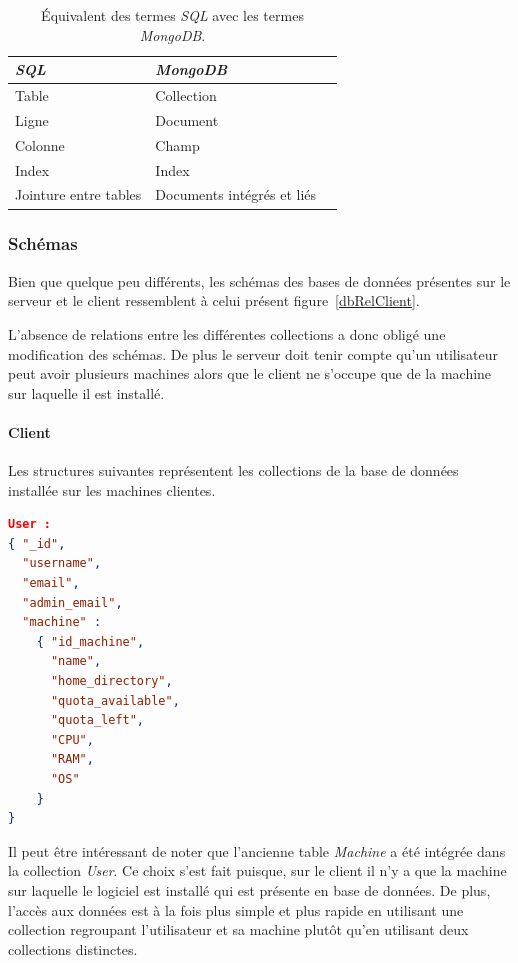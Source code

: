 \documentclass[a4paper,10pt, twoside]{report}
\begin{document}
\begin{spacing}{1.2}
\begin{table}[h!]
  \centering
  \def\arraystretch{1.5}
  \setlength{\fboxsep}{13pt} %
  \setlength{\fboxrule}{0pt} %
  \begin{tabular}{lm{6cm}m{6cm}}
   \rowcolor{arkred} 
    \arrayrulecolor{gray73}\hline
    \color{white} \textbf{\textit{SQL}} &
    \color{white} \textbf{\textit{MongoDB}}\\
    \hline
    Table & Collection\\
    \hline
    Ligne & Document\\
    \hline
    Colonne & Champ\\
    \hline
    Index & Index\\
    \hline
    Jointure entre tables & Documents intégrés et liés
  \end{tabular}
  \caption{\label{tabMappSQLMongoTerms} Équivalent des termes \textit{SQL}
  avec les termes \textit{MongoDB}.}
\end{table}

\subsubsection{Schémas}

Bien que quelque peu différents, les schémas des bases de données présentes
sur le serveur et le client ressemblent à celui présent
figure~\ref{dbRelClient}.

L'absence de relations entre les différentes collections a donc obligé une
modification des schémas. De plus le serveur doit tenir compte qu'un utilisateur
peut avoir plusieurs machines alors que le client ne s'occupe que de la machine
sur laquelle il est installé.

\paragraph{Client}

\bigskip

Les structures suivantes représentent les collections de la base de données
installée sur les machines clientes.

\begin{lstlisting}[language=json]
User :
{ "_id",
  "username",
  "email",
  "admin_email",
  "machine" :
    { "id_machine",
      "name",
      "home_directory",
      "quota_available",
      "quota_left",
      "CPU",
      "RAM",
      "OS"
    }
}
\end{lstlisting}

Il peut être intéressant de noter que l'ancienne table \textit{Machine} a été
intégrée dans la collection \textit{User}. Ce choix s'est fait puisque, sur
le client il n'y a que la machine sur laquelle le logiciel est installé qui est
présente en base de données. De plus, l'accès aux données est à la fois plus
simple et plus rapide en utilisant une collection regroupant l'utilisateur et
sa machine plutôt qu'en utilisant deux collections distinctes.


\end{spacing}
\end{document}
